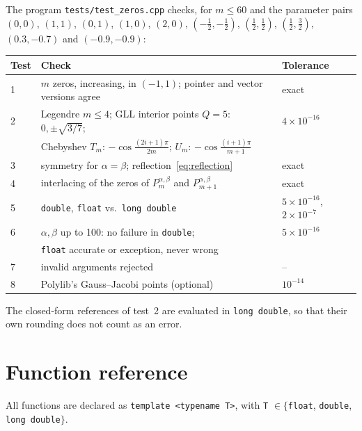 \documentclass[11pt,a4paper]{article}
\newcommand{\Pab}[1]{P_{#1}^{\alpha,\beta}}     %
\newcommand{\code}[1]{\texttt{#1}}
\begin{document}
The program \code{tests/test\_zeros.cpp} checks, for $m\le60$ and the
parameter pairs $(0,0)$, $(1,1)$, $(0,1)$, $(1,0)$, $(2,0)$,
$(-\tfrac12,-\tfrac12)$, $(\tfrac12,\tfrac12)$, $(\tfrac12,\tfrac32)$,
$(0.3,-0.7)$ and $(-0.9,-0.9)$:
\begin{center}
\begin{tabular}{@{}lll@{}}
\toprule
Test & Check & Tolerance \\
\midrule
1 & $m$ zeros, increasing, in $(-1,1)$; pointer and vector versions agree & exact \\
2 & Legendre $m\le4$; GLL interior points $Q=5$: $0,\pm\sqrt{3/7}$; & $4\times10^{-16}$ \\
  & Chebyshev $T_m$: $-\cos\frac{(2i+1)\pi}{2m}$; $U_m$: $-\cos\frac{(i+1)\pi}{m+1}$ & \\
3 & symmetry for $\alpha=\beta$; reflection~\eqref{eq:reflection} & exact \\
4 & interlacing of the zeros of $\Pab{m}$ and $\Pab{m+1}$ & exact \\
5 & \code{double}, \code{float} vs.\ \code{long double} & $5\times10^{-16}$, $2\times10^{-7}$ \\
6 & $\alpha,\beta$ up to 100: no failure in \code{double}; & $5\times10^{-16}$ \\
  & \code{float} accurate or exception, never wrong & \\
7 & invalid arguments rejected & -- \\
8 & Polylib's Gauss--Jacobi points (optional) & $10^{-14}$ \\
\bottomrule
\end{tabular}
\end{center}
The closed-form references of test~2 are evaluated in \code{long double}, so
that their own rounding does not count as an error.

\appendix
\section{Function reference}

All functions are declared as \code{template <typename T>}, with
\code{T} $\in\{$\code{float}, \code{double}, \code{long double}$\}$.
\end{document}

